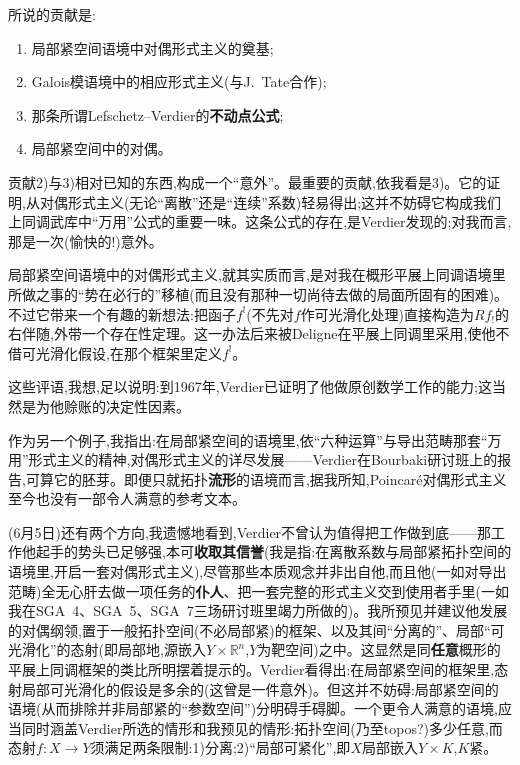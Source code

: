 
\dmark{}所说的贡献是:
\begingroup
\renewcommand{\labelenumi}{\arabic{enumi})}
\begin{enumerate}
\item 局部紧空间语境中对偶形式主义的奠基;
\item Galois模语境中的相应形式主义(与J.~Tate合作);
\item 那条所谓Lefschetz--Verdier的\textbf{不动点公式};
\item 局部紧空间中的对偶。
\end{enumerate}
\endgroup

贡献2)与3)相对已知的东西,构成一个“意外”。最重要的贡献,依我看是3)。它的证明,从对偶形式主义(无论“离散”还是“连续”系数)轻易得出;这并不妨碍它构成我们上同调武库中“万用”公式的重要一味。这条公式的存在,是Verdier发现的;对我而言,那是一次(愉快的!)意外。

局部紧空间语境中的对偶形式主义,就其实质而言,是对我在概形平展上同调语境里所做之事的“势在必行的”移植(而且没有那种一切尚待去做的局面所固有的困难)。不过它带来一个有趣的新想法:把函子$f^!$(不先对$f$作可光滑化处理)直接构造为$Rf_!$的右伴随,外带一个存在性定理。这一办法后来被Deligne在平展上同调里采用,使他不借可光滑化假设,在那个框架里定义$f^!$。

这些评语,我想,足以说明:到1967年,Verdier已证明了他做原创数学工作的能力;这当然是为他赊账的决定性因素。


作为另一个例子,我指出:在局部紧空间的语境里,依“六种运算”与导出范畴那套“万用”形式主义的精神,对偶形式主义的详尽发展——Verdier在Bourbaki研讨班上的报告,可算它的胚芽。即便只就拓扑\textbf{流形}的语境而言,据我所知,Poincaré对偶形式主义至今也没有一部令人满意的参考文本。

\dmark{}(6月5日)还有两个方向,我遗憾地看到,Verdier不曾认为值得把工作做到底——那工作他起手的势头已足够强,本可\textbf{收取其信誉}(我是指:在离散系数与局部紧拓扑空间的语境里,开启一套对偶形式主义),尽管那些本质观念并非出自他,而且他(一如对导出范畴)全无心肝去做一项任务的\textbf{仆人}、把一套完整的形式主义交到使用者手里(一如我在SGA~4、SGA~5、SGA~7三场研讨班里竭力所做的)。我所预见并建议他发展的对偶纲领,置于一般拓扑空间(不必局部紧)的框架、以及其间“分离的”、局部“可光滑化”的态射(即局部地,源嵌入$Y\times\mathbb{R}^n$,$Y$为靶空间)之中。这显然是同\textbf{任意}概形的平展上同调框架的类比所明摆着提示的。Verdier看得出:在局部紧空间的框架里,态射局部可光滑化的假设是多余的(这曾是一件意外)。但这并不妨碍:局部紧空间的语境(从而排除并非局部紧的“参数空间”)分明碍手碍脚。一个更令人满意的语境,应当同时涵盖Verdier所选的情形和我预见的情形:拓扑空间(乃至topos?)多少任意,而态射$f:X\to Y$须满足两条限制:1)分离;2)“局部可紧化”,即$X$局部嵌入$Y\times K$,$K$紧。

